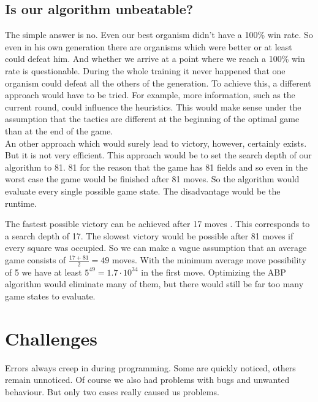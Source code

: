 \subsection{Is our algorithm unbeatable?}
The simple answer is no. Even our best organism didn't have a 100\% win rate. So even in his own generation there are organisms which were better or at least could defeat him. And whether we arrive at a point where we reach a 100\% win rate is questionable. During the whole training it never happened that one organism could defeat all the others of the generation. To achieve this, a different approach would have to be tried. For example, more information, such as the current round, could influence the heuristics. This would make sense under the assumption that the tactics are different at the beginning of the optimal game than at the end of the game.\\

An other approach which would surely lead to victory, however, certainly exists. But it is not very efficient. This approach would be to set the search depth of our algorithm to 81. 81 for the reason that the game has 81 fields and so even in the worst case the game would be finished after 81 moves. So the algorithm would evaluate every single possible game state. The disadvantage would be the runtime.

The fastest possible victory can be achieved after 17 moves \cite[p.~2]{web:amar2013}. This corresponds to a search depth of 17. The slowest victory would be possible after 81 moves if every square was occupied. So we can make a vague assumption that an average game consists of $\frac{17 + 81}{2} = 49$ moves. With the minimum average move possibility of 5 we have at least $5^{49} = 1.7 \cdot 10^{34}$ in the first move. Optimizing the ABP algorithm would eliminate many of them, but there would still be far too many game states to evaluate.

\section{Challenges}
Errors always creep in during programming. Some are quickly noticed, others remain unnoticed. Of course we also had problems with bugs and unwanted behaviour. But only two cases really caused us problems.

